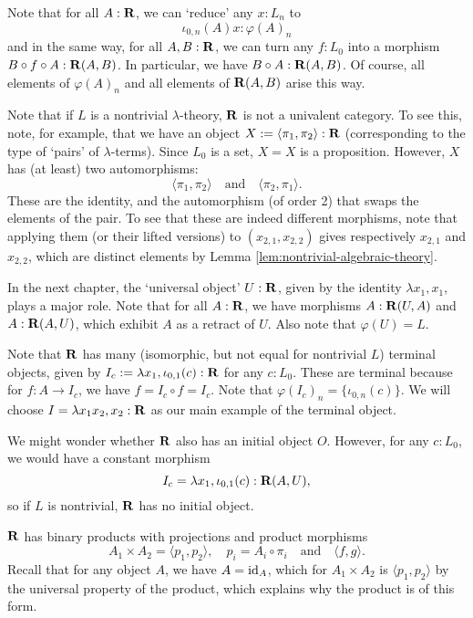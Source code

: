 \begin{remark}
  Note that for all $ A : \mathbf{R} $, we can `reduce' any $ x: L_n $ to
  \[ \iota_{0, n}(A) x : \varphi(A)_n \]
  and in the same way, for all $ A, B: \mathbf{R} $, we can turn any $ f: L_0 $ into a morphism $ B \circ f \circ A : \mathbf{R}(A, B) $. In particular, we have $ B \circ A : \mathbf{R}(A, B) $.
  Of course, all elements of $ \varphi(A)_n $ and all elements of $ \mathbf{R}(A, B) $ arise this way.
\end{remark}

\begin{remark}
  Note that if $ L $ is a nontrivial $ \lambda $-theory, $ \mathbf{R} $ is not a univalent category. To see this, note, for example, that we have an object $ X := \langle \pi_1, \pi_2 \rangle : \mathbf{R} $ (corresponding to the type of `pairs' of $ \lambda $-terms). Since $ L_0 $ is a set, $ X = X $ is a proposition. However, $ X $ has (at least) two automorphisms:
  \[ \langle \pi_1, \pi_2 \rangle \quad \text{and} \quad \langle \pi_2, \pi_1 \rangle. \]
  These are the identity, and the automorphism (of order 2) that swaps the elements of the pair. To see that these are indeed different morphisms, note that applying them (or their lifted versions) to $ (x_{2, 1}, x_{2, 2}) $ gives respectively $ x_{2, 1} $ and $ x_{2, 2} $, which are distinct elements by Lemma \ref{lem:nontrivial-algebraic-theory}.
\end{remark}

In the next chapter, the `universal object' $ U : \mathbf{R} $, given by the identity $ \lambda x_1, x_1 $, plays a major role. Note that for all $ A: \mathbf{R} $, we have morphisms $ A: \mathbf{R}(U, A) $ and $ A: \mathbf{R}(A, U) $, which exhibit $ A $ as a retract of $ U $. Also note that $ \varphi(U) = L $.

Note that $ \mathbf{R} $ has many (isomorphic, but not equal for nontrivial $ L $) terminal objects, given by $ I_c := \lambda x_1, \iota_{0, 1}(c) : \mathbf{R} $ for any $ c: L_0 $. These are terminal because for $ f: A \to I_c $, we have $ f = I_c \circ f = I_c $. Note that $ \varphi(I_c)_n = \{ \iota_{0, n}(c) \} $. We will choose $ I = \lambda x_1 x_2, x_2 : \mathbf{R} $ as our main example of the terminal object.

We might wonder whether $ \mathbf{R} $ also has an initial object $ O $. However, for any $ c: L_0 $, we would have a constant morphism
\[ I_c = \lambda x_1, \iota_{0, 1}(c) : \mathbf{R}(A, U), \]
so if $ L $ is nontrivial, $ \mathbf{R} $ has no initial object.

$ \mathbf{R} $ has binary products with projections and product morphisms
\[ A_1 \times A_2 = \langle p_1, p_2 \rangle, \quad p_i = A_i \circ \pi_i \quad \text{and} \quad \langle f, g \rangle. \]
Recall that for any object $ A $, we have $ A = \text{id}_{A} $, which for $ A_1 \times A_2 $ is $ \langle p_1, p_2 \rangle $ by the universal property of the product, which explains why the product is of this form.

